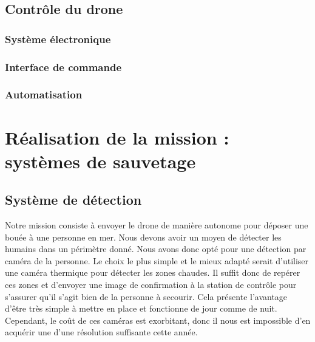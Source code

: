 \documentclass[a4paper,12pt,french]{report}
\begin{document}
\newpage
\section{Contrôle du drone}

\subsection{Système électronique}

\subsection{Interface de commande}

\subsection{Automatisation}

\chapter{Réalisation de la mission : systèmes de sauvetage}

\section{Système de détection}

Notre mission consiste à envoyer le drone de manière autonome pour déposer une bouée à une personne en mer. Nous devons avoir un moyen de détecter les humains dans un périmètre donné. Nous avons donc opté pour une détection par caméra de la personne. Le choix le plus simple et le mieux adapté serait d'utiliser une caméra thermique pour détecter les zones chaudes. Il suffit donc de repérer ces zones et d'envoyer une image de confirmation à la station de contrôle pour s'assurer qu'il s'agit bien de la personne à secourir. Cela présente l'avantage d'être très simple à mettre en place et fonctionne de jour comme de nuit. Cependant, le coût de ces caméras est exorbitant, donc il nous est impossible d'en acquérir une d'une résolution suffisante cette année.\newline
\end{document}
